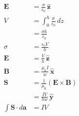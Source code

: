 \documentclass{article}
\renewcommand{\vec}[1]{\boldsymbol{\mathbf{#1}}}
\newcommand{\uvec}[1]{\hat{\vec{#1}}}
\begin{document}
\begin{enumerate}
        \begin{align*}
          \vec{E}                      & = \frac{\sigma}{\epsilon_0} \,\uvec{z}     \\
          V                            & = \int_0^h \frac{\sigma}{\epsilon_0} \,d z \\
                                       & = \frac{\sigma h}{\epsilon_0}              \\
          \sigma                       & = \frac{\epsilon_0 V}{h}                   \\
          \vec{E}                      & = \frac{V}{h} \,\uvec{z}                   \\
          \vec{B}                      & = \frac{\mu_0 I}{w} \,\uvec{x}             \\
          \vec{S}                      & = \frac{1}{\mu_0} (\vec{E} \times \vec{B}) \\
                                       & = \frac{I V}{h w} \,\uvec{y}               \\
          \int \vec{S} \cdot d \vec{a} & = I V
        \end{align*}
\end{enumerate}

\subsection{}
\end{document}
